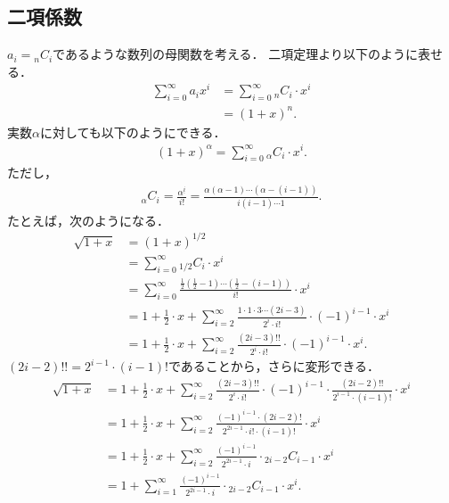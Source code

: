 \documentclass{jsarticle}
\begin{document}
\subsection{二項係数}
$a_i = {}_n C_i$であるような数列の母関数を考える．
二項定理より以下のように表せる．
\begin{align*}
  \sum_{i=0}^\infty a_i x^i &= \sum_{i=0}^\infty {}_n C_i\cdot x^i\\
  &= (1+x)^n.
\end{align*}
実数$\alpha$に対しても以下のようにできる．
\begin{align*}
  (1+x)^\alpha = \sum_{i=0}^\infty {}_\alpha C_i\cdot x^i.
\end{align*}
ただし，
\begin{align*}
  {}_\alpha C_i = \frac{\alpha^{\underline{i}}}{i!}
  = \frac{\alpha(\alpha-1)\cdots(\alpha-(i-1))}{i(i-1)\cdots 1}.
\end{align*}
たとえば，次のようになる．
\begin{align*}
  \sqrt{1+x} &= (1+x)^{1/2}\\
  &= \sum_{i=0}^\infty {}_{1/2} C_i\cdot x^i\\
  &= \sum_{i=0}^\infty \frac{\frac{1}{2}\left(\frac{1}{2}-1\right)\cdots\left(\frac{1}{2}-(i-1)\right)}{i!} \cdot x^i\\
  &= 1 + \frac{1}{2}\cdot x + \sum_{i=2}^\infty \frac{1\cdot 1\cdot 3\cdots(2i-3)}{2^i\cdot i!}\cdot(-1)^{i-1}\cdot x^i\\
  &= 1 + \frac{1}{2}\cdot x + \sum_{i=2}^\infty \frac{(2i-3)!!}{2^i\cdot i!}\cdot(-1)^{i-1}\cdot x^i.
\end{align*}
$(2i-2)!! = 2^{i-1}\cdot(i-1)!$であることから，さらに変形できる．
\begin{align*}
  \sqrt{1+x}
  &= 1 + \frac{1}{2}\cdot x + \sum_{i=2}^\infty \frac{(2i-3)!!}{2^i\cdot i!}\cdot(-1)^{i-1} \cdot\frac{(2i-2)!!}{2^{i-1}\cdot(i-1)!}\cdot x^i\\
  &= 1 + \frac{1}{2}\cdot x + \sum_{i=2}^\infty \frac{(-1)^{i-1}\cdot(2i-2)!}{2^{2i-1}\cdot i!\cdot(i-1)!}\cdot x^i\\
  &= 1 + \frac{1}{2}\cdot x + \sum_{i=2}^\infty \frac{(-1)^{i-1}}{2^{2i-1}\cdot i}\cdot {}_{2i-2}C_{i-1}\cdot x^i\\
  &= 1 + \sum_{i=1}^\infty \frac{(-1)^{i-1}}{2^{2i-1}\cdot i}\cdot {}_{2i-2}C_{i-1}\cdot x^i.
\end{align*}
\end{document}
